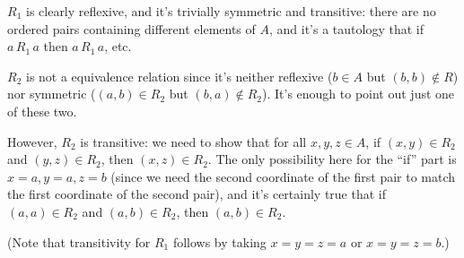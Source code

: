\documentclass[12pt]{article}
\begin{document}
\begin{enumerate}
\bigskip

$R_1$ is clearly reflexive, and it's trivially symmetric and transitive: there are no ordered pairs containing different elements of $A$, and it's a tautology that if $a\, R_1\, a$ then $a\, R_1\, a$, etc.

$R_2$ is not a equivalence relation since it's neither reflexive ($b\in A$ but $(b,b)\notin R$) nor symmetric ($(a,b)\in R_2$ but $(b,a)\notin R_2$). It's enough to point out just one of these two.

However, $R_2$ is transitive: we need to show that for all $x,y,z\in A$, if $(x,y)\in R_2$ and $(y,z)\in R_2$, then $(x,z)\in R_2$. The only possibility here for the ``if'' part is $x=a, y=a, z=b$ (since we need the second coordinate of the first pair to match the first coordinate of the second pair), and it's certainly true that if $(a,a)\in R_2$ and $(a,b)\in R_2$, then $(a,b)\in R_2$.

(Note that transitivity for $R_1$ follows by taking $x=y=z=a$ or $x=y=z=b$.)
 \end{enumerate}
\end{document}
